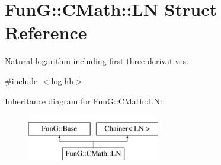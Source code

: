 \hypertarget{structFunG_1_1CMath_1_1LN}{\section{Fun\-G\-:\-:C\-Math\-:\-:L\-N Struct Reference}
\label{structFunG_1_1CMath_1_1LN}
}


Natural logarithm including first three derivatives.  




{\ttfamily \#include $<$log.\-hh$>$}

Inheritance diagram for Fun\-G\-:\-:C\-Math\-:\-:L\-N\-:\begin{figure}[H]
\begin{center}
\leavevmode
\includegraphics[height=2.000000cm]{structFunG_1_1CMath_1_1LN}
\end{center}
\end{figure}
